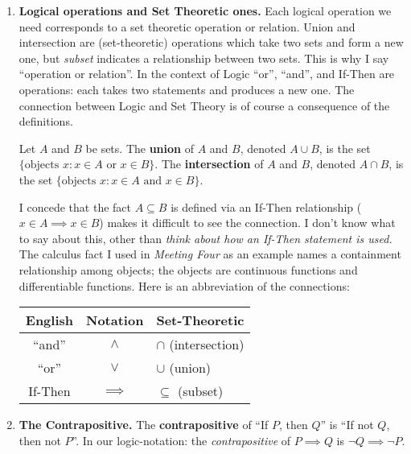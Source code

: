 \documentclass[10pt, AMS Euler]{article}
\begin{document}
\begin{enumerate}

\item {\bf Logical operations and Set Theoretic ones.}  Each logical operation we need corresponds to a set theoretic operation or relation.
Union and intersection are (set-theoretic) operations which take two sets and form a new one, but \emph{subset} indicates a relationship between two sets.
This is why I say ``operation or relation''.
In the context of Logic ``or'', ``and'', and If-Then are operations: each takes two statements and produces a new one.
The connection between Logic and Set Theory is of course a consequence of the definitions.

Let $A$ and $B$ be sets.  The {\bf union} of $A$ and $B$, denoted $A \cup B$, is the set $\{\mbox{objects $x$}: x \in A \mbox{ or } x \in B\}$.
The {\bf intersection} of $A$ and $B$, denoted $A \cap B$, is the set $\{\mbox{objects $x$}: x \in A \mbox{ and } x \in B\}$.

I concede that the fact $A \subseteq B$ is defined via an If-Then relationship ($x \in A \implies x \in B$) makes it difficult to see the connection.
I don't know what to say about this, other than \emph{think about how an If-Then statement is used.}  The calculus fact I used in \emph{Meeting Four} 
as an example names a containment relationship among objects; the objects are continuous functions and differentiable functions.  
Here is an abbreviation of the connections:

\begin{center}
\begin{tabular}{|c|c|l|}
  \hline
  English & Notation & Set-Theoretic \\ \hline
  ``and'' & $\wedge$ & $\cap$ (intersection) \\
  ``or'' & $\vee$ & $\cup$ (union) \\
  If-Then & $\implies$ & $\subseteq$ (subset) \\ \hline

\end{tabular}
\end{center}

\item {\bf The Contrapositive.}  The {\bf contrapositive} of ``If $P$, then $Q$'' is ``If not $Q$, then not $P$''.  
In our logic-notation: the \emph{contrapositive} of  $P \implies Q$ is $\neg Q \implies \neg P$.


\end{enumerate}
\end{document}
